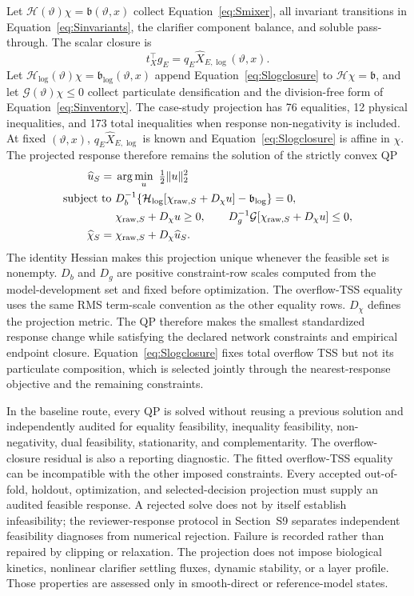 \documentclass[a4paper,fleqn]{cas-sc}
\begin{document}
Let $\mathcal H(\vartheta)\chi=\mathfrak b(\vartheta,x)$ collect Equation~\eqref{eq:Smixer}, all invariant transitions in Equation~\eqref{eq:Sinvariants}, the clarifier component balance, and soluble pass-through. The scalar closure is
\begin{equation}
t_X^\top g_E=q_E\widehat X_{E,\log}(\vartheta,x).
\label{eq:Slogclosure}
\end{equation}
Let $\mathcal H_{\log}(\vartheta)\chi=\mathfrak b_{\log}(\vartheta,x)$ append Equation~\eqref{eq:Slogclosure} to $\mathcal H\chi=\mathfrak b$, and let $\mathcal G(\vartheta)\chi\le0$ collect particulate densification and the division-free form of Equation~\eqref{eq:Sinventory}. The case-study projection has 76 equalities, 12 physical inequalities, and 173 total inequalities when response non-negativity is included. At fixed $(\vartheta,x)$, $q_E\widehat X_{E,\log}$ is known and Equation~\eqref{eq:Slogclosure} is affine in $\chi$. The projected response therefore remains the solution of the strictly convex QP
\begin{align}
\widehat u_S={}&\arg\min_u\ \tfrac12\|u\|_2^2\notag\\
\text{subject to }&D_b^{-1}\{\mathcal H_{\log}[\chi_{{\rm raw},S}+D_\chi u]-\mathfrak b_{\log}\}=0,\notag\\
&\chi_{{\rm raw},S}+D_\chi u\ge0,\qquad
D_g^{-1}\mathcal G[\chi_{{\rm raw},S}+D_\chi u]\le0,\notag\\
\widehat\chi_S={}&\chi_{{\rm raw},S}+D_\chi\widehat u_S.
\label{eq:SQP}
\end{align}
The identity Hessian makes this projection unique whenever the feasible set is nonempty. $D_b$ and $D_g$ are positive constraint-row scales computed from the model-development set and fixed before optimization. The overflow-TSS equality uses the same RMS term-scale convention as the other equality rows. $D_\chi$ defines the projection metric. The QP therefore makes the smallest standardized response change while satisfying the declared network constraints and empirical endpoint closure. Equation~\eqref{eq:Slogclosure} fixes total overflow TSS but not its particulate composition, which is selected jointly through the nearest-response objective and the remaining constraints.

In the baseline route, every QP is solved without reusing a previous solution and independently audited for equality feasibility, inequality feasibility, non-negativity, dual feasibility, stationarity, and complementarity. The overflow-closure residual is also a reporting diagnostic. The fitted overflow-TSS equality can be incompatible with the other imposed constraints. Every accepted out-of-fold, holdout, optimization, and selected-decision projection must supply an audited feasible response. A rejected solve does not by itself establish infeasibility; the reviewer-response protocol in Section~S9 separates independent feasibility diagnoses from numerical rejection. Failure is recorded rather than repaired by clipping or relaxation. The projection does not impose biological kinetics, nonlinear clarifier settling fluxes, dynamic stability, or a layer profile. Those properties are assessed only in smooth-direct or reference-model states.
\end{document}

